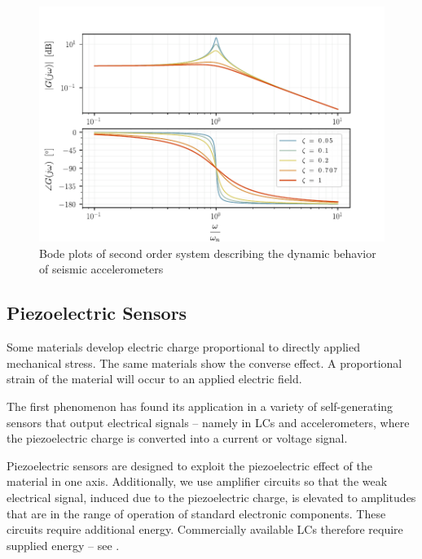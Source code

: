 \begin{figure}[!htb]
    \centering
    \includegraphics[scale=0.8]{figures/measurement/accel/seismic_accelerometer_edited}
    \caption[Second-Order System Bode plots]{Bode plots of second order system describing the dynamic behavior of seismic accelerometers}
    \label{fig:seismic_accelerometer_edited}
\end{figure}

\subsection{Piezoelectric Sensors}
Some materials develop electric charge proportional to directly applied mechanical stress. The same materials show the converse effect. A proportional strain of the material will occur to an applied electric field.

The first phenomenon has found its application in a variety of self-generating sensors that output electrical signals -- namely in \ac{LC}s and accelerometers, where the piezoelectric charge is converted into a current or voltage signal.

Piezoelectric sensors are designed to exploit the piezoelectric effect of the material in one axis. Additionally, we use amplifier circuits so that the weak electrical signal, induced due to the piezoelectric charge, is elevated to amplitudes that are in the range of operation of standard electronic components. These circuits require additional energy. Commercially available \ac{LC}s therefore require supplied energy -- see .

